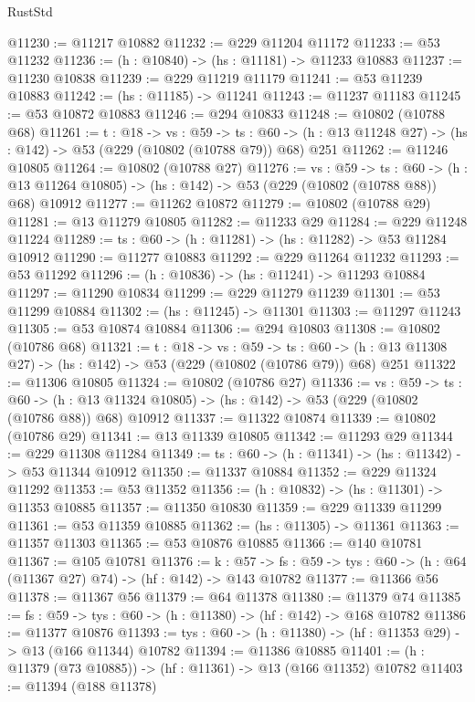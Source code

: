 \begin{lexlean}{RustStd}
\begin{coremodule}
@11230 := @11217 @10882
@11232 := @229 @11204 @11172
@11233 := @53 @11232
@11236 := (h : @10840) -> (hs : @11181) -> @11233 @10883
@11237 := @11230 @10838
@11239 := @229 @11219 @11179
@11241 := @53 @11239 @10883
@11242 := (hs : @11185) -> @11241
@11243 := @11237 @11183
@11245 := @53 @10872 @10883
@11246 := @294 @10833
@11248 := @10802 (@10788 @68)
@11261 := {t : @18} ->
  {vs : @59} ->
  {ts : @60} -> (h : @13 @11248 @27) -> (hs : @142) -> @53 (@229 (@10802 (@10788 @79)) @68) @251
@11262 := @11246 @10805
@11264 := @10802 (@10788 @27)
@11276 := {vs : @59} ->
  {ts : @60} ->
  (h : @13 @11264 @10805) -> (hs : @142) -> @53 (@229 (@10802 (@10788 @88)) @68) @10912
@11277 := @11262 @10872
@11279 := @10802 (@10788 @29)
@11281 := @13 @11279 @10805
@11282 := @11233 @29
@11284 := @229 @11248 @11224
@11289 := {ts : @60} -> (h : @11281) -> (hs : @11282) -> @53 @11284 @10912
@11290 := @11277 @10883
@11292 := @229 @11264 @11232
@11293 := @53 @11292
@11296 := (h : @10836) -> (hs : @11241) -> @11293 @10884
@11297 := @11290 @10834
@11299 := @229 @11279 @11239
@11301 := @53 @11299 @10884
@11302 := (hs : @11245) -> @11301
@11303 := @11297 @11243
@11305 := @53 @10874 @10884
@11306 := @294 @10803
@11308 := @10802 (@10786 @68)
@11321 := {t : @18} ->
  {vs : @59} ->
  {ts : @60} -> (h : @13 @11308 @27) -> (hs : @142) -> @53 (@229 (@10802 (@10786 @79)) @68) @251
@11322 := @11306 @10805
@11324 := @10802 (@10786 @27)
@11336 := {vs : @59} ->
  {ts : @60} ->
  (h : @13 @11324 @10805) -> (hs : @142) -> @53 (@229 (@10802 (@10786 @88)) @68) @10912
@11337 := @11322 @10874
@11339 := @10802 (@10786 @29)
@11341 := @13 @11339 @10805
@11342 := @11293 @29
@11344 := @229 @11308 @11284
@11349 := {ts : @60} -> (h : @11341) -> (hs : @11342) -> @53 @11344 @10912
@11350 := @11337 @10884
@11352 := @229 @11324 @11292
@11353 := @53 @11352
@11356 := (h : @10832) -> (hs : @11301) -> @11353 @10885
@11357 := @11350 @10830
@11359 := @229 @11339 @11299
@11361 := @53 @11359 @10885
@11362 := (hs : @11305) -> @11361
@11363 := @11357 @11303
@11365 := @53 @10876 @10885
@11366 := @140 @10781
@11367 := @105 @10781
@11376 := {k : @57} ->
  {fs : @59} -> {tys : @60} -> (h : @64 (@11367 @27) @74) -> (hf : @142) -> @143 @10782
@11377 := @11366 @56
@11378 := @11367 @56
@11379 := @64 @11378
@11380 := @11379 @74
@11385 := {fs : @59} -> {tys : @60} -> (h : @11380) -> (hf : @142) -> @168 @10782
@11386 := @11377 @10876
@11393 := {tys : @60} -> (h : @11380) -> (hf : @11353 @29) -> @13 (@166 @11344) @10782
@11394 := @11386 @10885
@11401 := (h : @11379 (@73 @10885)) -> (hf : @11361) -> @13 (@166 @11352) @10782
@11403 := @11394 (@188 @11378)

\end{coremodule}
\end{lexlean}
